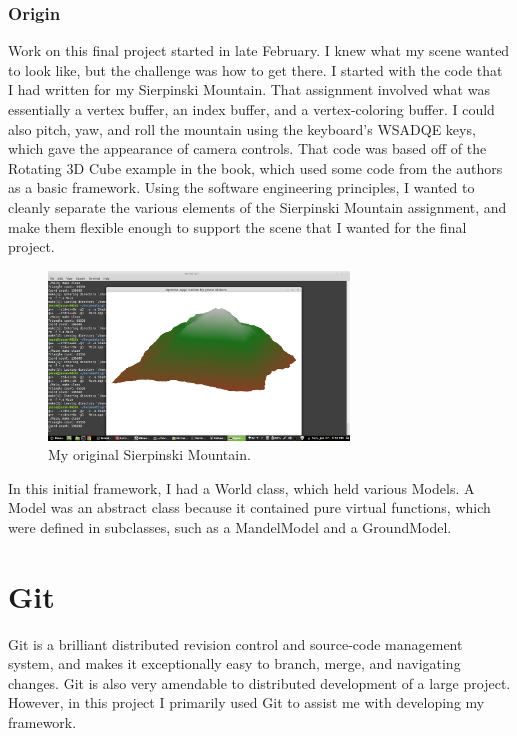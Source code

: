 \documentclass[journal]{IEEEtran}
\begin{document}
\subsubsection{Origin}

Work on this final project started in late February. I knew what my scene wanted to look like, but the challenge was how to get there. I started with the code that I had written for my Sierpinski Mountain. That assignment involved what was essentially a vertex buffer, an index buffer, and a vertex-coloring buffer. I could also pitch, yaw, and roll the mountain using the keyboard's WSADQE keys, which gave the appearance of camera controls. That code was based off of the Rotating 3D Cube example in the book, which used some code from the authors as a basic framework. Using the software engineering principles, I wanted to cleanly separate the various elements of the Sierpinski Mountain assignment, and make them flexible enough to support the scene that I wanted for the final project.

\begin{figure}[htbp]
\centering
\fbox
{
	\begin{minipage}{8 cm}
		\includegraphics[width=80mm]{resources/Sierpinski_Mountain.jpg}
		\caption{My original Sierpinski Mountain.}
	\end{minipage}
}
\end{figure}

In this initial framework, I had a World class, which held various Models. A Model was an abstract class because it contained pure virtual functions, which were defined in subclasses, such as a MandelModel and a GroundModel.

\section{Git}

Git is a brilliant distributed revision control and source-code management system, and makes it exceptionally easy to branch, merge, and navigating changes. Git is also very amendable to distributed development of a large project. However, in this project I primarily used Git to assist me with developing my framework.
\end{document}
